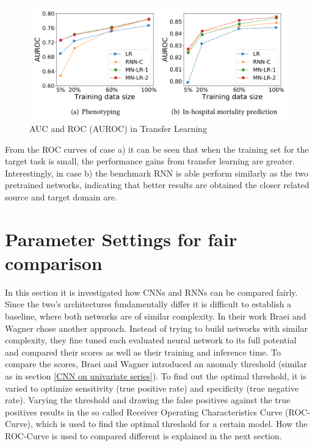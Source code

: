 \begin{figure}[h]
	\centering
	\includegraphics[scale=00.25]{Figures/AUROC}
	\decoRule
	\caption[AUC and ROC in Transfer Learning]{AUC and ROC (AUROC) in Transfer Learning \parencite{Gupta2018}}
	\label{fig:AUC Transfer}
\end{figure}

From the ROC curves of case a) it can be seen that when the training set for the target task is small, the performance gains from transfer learning are greater. Interestingly, in case b) the benchmark RNN is able perform similarly as the two pretrained networks, indicating that better results are obtained the closer related source and target domain are.

\section{Parameter Settings for fair comparison}
In this section it is investigated how CNNs and RNNs can be compared fairly. Since the two's architectures fundamentally differ it is difficult to establish a baseline, where both networks are of similar complexity. In their work Braei and Wagner \parencite*{Braei2020} chose another approach. Instead of trying to build networks with similar complexity, they fine tuned each evaluated neural network to its full potential and compared their scores as well as their training and inference time. To compare the scores, Braei and Wagner introduced an anomaly threshold (similar as in section \ref{CNN on univariate series}). To find out the optimal threshold, it is varied to optimize sensitivity (true positive rate) and specificity (true negative rate). Varying the threshold and drawing the false positives against the true positives results in the so called Receiver Operating Characteristics Curve (ROC-Curve), which is used to find the optimal threshold for a certain model. How the ROC-Curve is used to compared different is explained in the next section.

